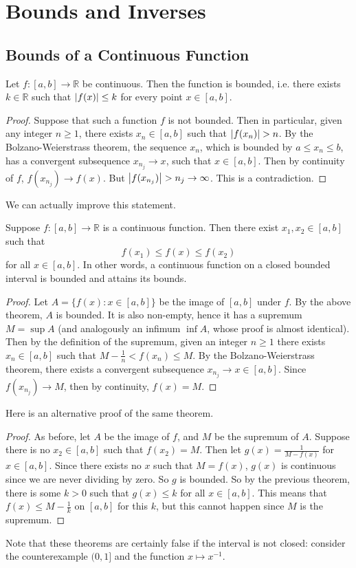 \documentclass{article}
\begin{document}
\section{Bounds and Inverses}
\subsection{Bounds of a Continuous Function}
\begin{theorem}
    Let $f \colon [a, b] \to \mathbb R$ be continuous. Then the function is bounded, i.e. there exists $k \in \mathbb R$ such that $\abs{f(x)} \leq k$ for every point $x \in [a, b]$.
\end{theorem}
\begin{proof}
    Suppose that such a function $f$ is not bounded. Then in particular, given any integer $n \geq 1$, there exists $x_n \in [a, b]$ such that $\abs{f(x_n)} > n$. By the Bolzano-Weierstrass theorem, the sequence $x_n$, which is bounded by $a \leq x_n \leq b$, has a convergent subsequence $x_{n_j} \to x$, such that $x \in [a, b]$. Then by continuity of $f$, $f(x_{n_j}) \to f(x)$. But $\abs{f(x_{n_j})} > n_j \to \infty$. This is a contradiction.
\end{proof}
\noindent We can actually improve this statement.
\begin{theorem}
    Suppose $f \colon [a, b] \to \mathbb R$ is a continuous function. Then there exist $x_1, x_2 \in [a, b]$ such that
    \[ f(x_1) \leq f(x) \leq f(x_2) \]
    for all $x \in [a, b]$. In other words, a continuous function on a closed bounded interval is bounded and attains its bounds.
\end{theorem}
\begin{proof}
    Let $A = \{ f(x) \colon x \in [a, b] \}$ be the image of $[a, b]$ under $f$. By the above theorem, $A$ is bounded. It is also non-empty, hence it has a supremum $M = \sup A$ (and analogously an infimum $\inf A$, whose proof is almost identical). Then by the definition of the supremum, given an integer $n \geq 1$ there exists $x_n \in [a, b]$ such that $M - \frac{1}{n} < f(x_n) \leq M$. By the Bolzano-Weierstrass theorem, there exists a convergent subsequence $x_{n_j} \to x \in [a, b]$. Since $f(x_{n_j}) \to M$, then by continuity, $f(x) = M$.
\end{proof}
\noindent Here is an alternative proof of the same theorem.
\begin{proof}
    As before, let $A$ be the image of $f$, and $M$ be the supremum of $A$. Suppose there is no $x_2 \in [a, b]$ such that $f(x_2) = M$. Then let $g(x) = \frac{1}{M - f(x)}$ for $x \in [a, b]$. Since there exists no $x$ such that $M = f(x)$, $g(x)$ is continuous since we are never dividing by zero. So $g$ is bounded. So by the previous theorem, there is some $k > 0$ such that $g(x) \leq k$ for all $x \in [a, b]$. This means that $f(x) \leq M - \frac{1}{k}$ on $[a, b]$ for this $k$, but this cannot happen since $M$ is the supremum.
\end{proof}
\noindent Note that these theorems are certainly false if the interval is not closed: consider the counterexample $(0, 1]$ and the function $x \mapsto x^{-1}$.
\end{document}
